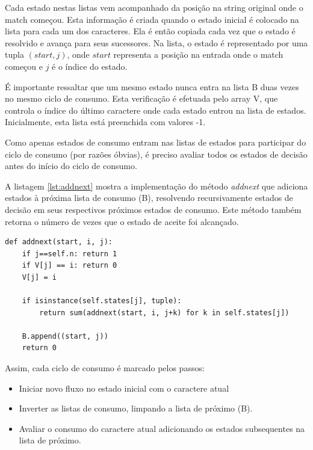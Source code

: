 \documentclass[a4paper,12pt,oneside,onecolumn]{uerj}
\begin{document}
Cada estado nestas listas vem acompanhado da posição na string original onde o match começou. Esta informação é criada quando o estado inicial é colocado na lista para cada um dos caracteres. Ela é então copiada cada vez que o estado é resolvido e avança para seus sucessores. Na lista, o estado é representado por uma tupla $(start, j)$, onde $start$ representa a posição na entrada onde o match começou e $j$ é o índice do estado.

É importante ressaltar que um mesmo estado nunca entra na lista B duas vezes no mesmo ciclo de consumo. Esta verificação é efetuada pelo array V, que controla o índice do último caractere onde cada estado entrou na lista de estados. Inicialmente, esta lista está preenchida com valores -1.

Como apenas estados de consumo entram nas listas de estados para participar do ciclo de consumo (por razões óbvias), é preciso avaliar todos os estados de decisão antes do início do ciclo de consumo. 

A listagem \ref{lst:addnext} mostra a implementação do método \emph{addnext} que adiciona estados à próxima lista de consumo (B), resolvendo recursivamente estados de decisão em seus respectivos próximos estados de consumo. Este método também retorna o número de vezes que o estado de aceite foi alcançado.

\vspace{0.5cm}
\begin{lstlisting}[caption={Implementação do método \emph{addnext}},label=lst:addnext]
def addnext(start, i, j):
    if j==self.n: return 1
    if V[j] == i: return 0
    V[j] = i

    if isinstance(self.states[j], tuple):
        return sum(addnext(start, i, j+k) for k in self.states[j])

    B.append((start, j))
    return 0
\end{lstlisting}

Assim, cada ciclo de consumo é marcado pelos passos:

\begin{itemize}
    \item Iniciar novo fluxo no estado inicial com o caractere atual
    \item Inverter as listas de consumo, limpando a lista de próximo (B).
    \item Avaliar o consumo do caractere atual adicionando os estados subsequentes na lista de próximo.
\end{itemize}
\end{document}
